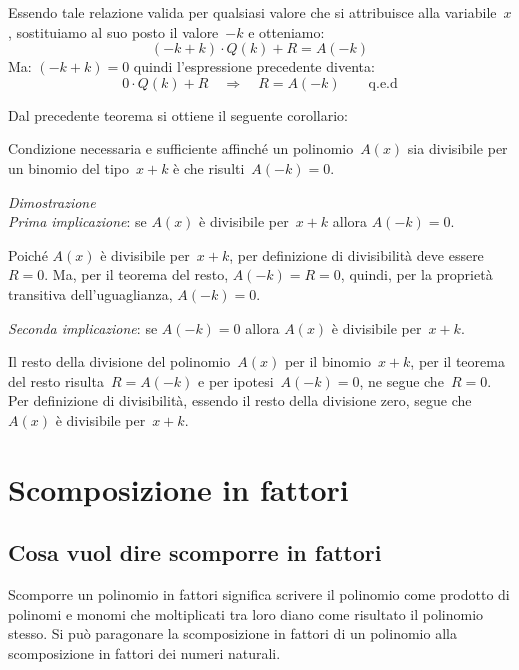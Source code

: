 Essendo tale relazione valida per qualsiasi valore che si attribuisce
alla variabile~\(x\), sostituiamo al suo posto il valore~\(-k\) e otteniamo:
\[(-k+k) \cdot Q(k)+R=A(-k)\]
Ma: \((-k+k)=0\) quindi l'espressione precedente diventa:
\[0 \cdot Q(k)+R \quad \Longrightarrow \quad R=A(-k) \qquad \text{q.e.d}\]

Dal precedente teorema si ottiene il seguente corollario:

\begin{teorema}[di Ruffini]
Condizione necessaria e sufficiente affinché un polinomio~\(A(x)\) 
sia divisibile per un binomio del tipo~\(x+k\) è
che risulti~\(A(-k)=0\).
\end{teorema}

\emph{Dimostrazione}\\
\emph{Prima implicazione}: \quad se \(A(x)\) è divisibile 
per~\(x+k\) \quad allora \quad \(A(-k)=0\).

Poiché \(A(x)\) è divisibile per~\(x+k\), per definizione di divisibilità 
deve essere~\(R=0\). 
Ma, per il teorema del resto, \(A(-k)=R=0\), 
quindi, per la proprietà transitiva dell'uguaglianza, \(A(-k)=0\).

\noindent \emph{Seconda implicazione}: \quad se \(A(-k)=0\) \quad 
allora \quad \(A(x)\) è divisibile per~\(x+k\).

Il resto della divisione del polinomio~\(A(x)\) per il binomio~\(x+k\),
per il teorema del resto risulta~\(R=A(-k)\) e per ipotesi~\(A(-k)=0\),
ne segue che~\(R=0\). Per definizione di divisibilità, essendo il
resto della divisione zero, segue che~\(A(x)\) è divisibile per~\(x+k\).


\section{Scomposizione in fattori}

\subsection{Cosa vuol dire scomporre in fattori}
\label{subsec:divpol_scomporre}

Scomporre un polinomio in fattori significa scrivere il polinomio come 
prodotto di polinomi e monomi che
moltiplicati tra loro diano come risultato il polinomio stesso. 
Si può paragonare la scomposizione in fattori
di un polinomio alla scomposizione in fattori dei numeri naturali.


